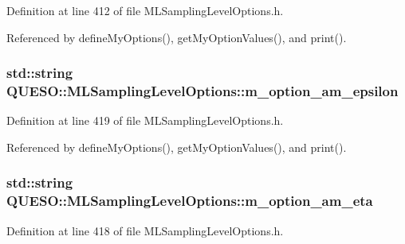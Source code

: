 Definition at line 412 of file M\-L\-Sampling\-Level\-Options.\-h.



Referenced by define\-My\-Options(), get\-My\-Option\-Values(), and print().

\hypertarget{class_q_u_e_s_o_1_1_m_l_sampling_level_options_a5ecc043caa63c4a6980ed61f370bd59a}{
\subsubsection[{m\-\_\-option\-\_\-am\-\_\-epsilon}]{\setlength{\rightskip}{0pt plus 5cm}std\-::string Q\-U\-E\-S\-O\-::\-M\-L\-Sampling\-Level\-Options\-::m\-\_\-option\-\_\-am\-\_\-epsilon\hspace{0.3cm}{\ttfamily [private]}}}\label{class_q_u_e_s_o_1_1_m_l_sampling_level_options_a5ecc043caa63c4a6980ed61f370bd59a}


Definition at line 419 of file M\-L\-Sampling\-Level\-Options.\-h.



Referenced by define\-My\-Options(), get\-My\-Option\-Values(), and print().

\hypertarget{class_q_u_e_s_o_1_1_m_l_sampling_level_options_a6fb0d64c285c2a3411fb24667a03f747}{
\subsubsection[{m\-\_\-option\-\_\-am\-\_\-eta}]{\setlength{\rightskip}{0pt plus 5cm}std\-::string Q\-U\-E\-S\-O\-::\-M\-L\-Sampling\-Level\-Options\-::m\-\_\-option\-\_\-am\-\_\-eta\hspace{0.3cm}{\ttfamily [private]}}}\label{class_q_u_e_s_o_1_1_m_l_sampling_level_options_a6fb0d64c285c2a3411fb24667a03f747}


Definition at line 418 of file M\-L\-Sampling\-Level\-Options.\-h.



